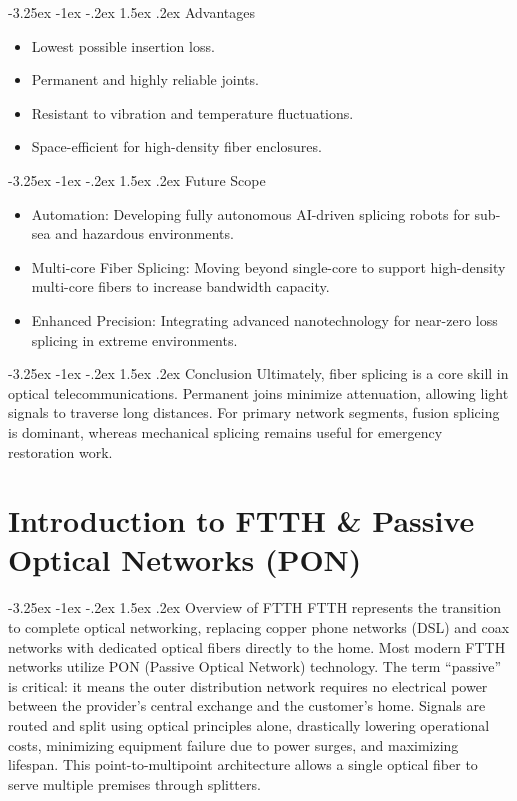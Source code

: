 \documentclass[11pt,a4paper]{report}
\makeatletter
\renewcommand{\section}{\@startsection{section}{1}{\z@}%
  {-3.25ex \@plus -1ex \@minus -.2ex}%
  {1.5ex \@plus.2ex}%
  {\normalfont\Large\bfseries\color{primaryColor}}}
\makeatother
\begin{document}
\section{Advantages}
\begin{itemize}
  \item Lowest possible insertion loss.
  \item Permanent and highly reliable joints.
  \item Resistant to vibration and temperature fluctuations.
  \item Space-efficient for high-density fiber enclosures.
\end{itemize}
\section{Future Scope}
\begin{itemize}
  \item Automation: Developing fully autonomous AI-driven splicing robots for sub-sea and hazardous environments.
  \item Multi-core Fiber Splicing: Moving beyond single-core to support high-density multi-core fibers to increase bandwidth capacity.
  \item Enhanced Precision: Integrating advanced nanotechnology for near-zero loss splicing in extreme environments.
\end{itemize}
\section{Conclusion}
Ultimately, fiber splicing is a core skill in optical telecommunications. Permanent joins minimize attenuation, allowing light signals to traverse long distances. For primary network segments, fusion splicing is dominant, whereas mechanical splicing remains useful for emergency restoration work.
\chapter{Introduction to FTTH \& Passive Optical Networks (PON)}
\section{Overview of FTTH}
FTTH represents the transition to complete optical networking, replacing copper phone networks (DSL) and coax networks with dedicated optical fibers directly to the home. Most modern FTTH networks utilize PON (Passive Optical Network) technology. The term ``passive'' is critical: it means the outer distribution network requires no electrical power between the provider's central exchange and the customer's home. Signals are routed and split using optical principles alone, drastically lowering operational costs, minimizing equipment failure due to power surges, and maximizing lifespan. This point-to-multipoint architecture allows a single optical fiber to serve multiple premises through splitters.
\end{document}

